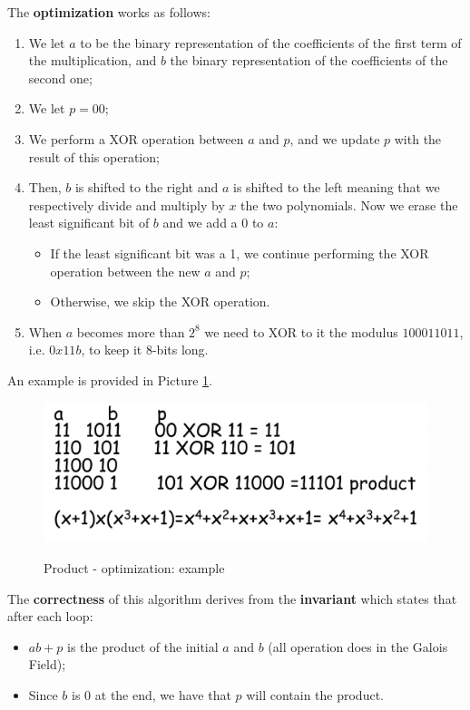The \textbf{optimization} works as follows:

\begin{enumerate}
    \item We let $a$ to be the binary representation of the coefficients of the first term of the multiplication, and $b$ the binary representation of the coefficients of the second one;
    \item We let $p = 00$;
    \item We perform a XOR operation between $a$ and $p$, and we update $p$ with the result of this operation;
    \item Then, $b$ is shifted to the right and $a$ is shifted to the left meaning that we respectively divide and multiply by $x$ the two polynomials. Now we erase the least significant bit of $b$ and we add a 0 to $a$:
    \begin{itemize}
        \item If the least significant bit was a 1, we continue performing the XOR operation between the new $a$ and $p$;
        \item Otherwise, we skip the XOR operation. 
    \end{itemize}
    \item When $a$ becomes more than $2^8$ we need to XOR to it the modulus $100011011$, i.e. $0x11b$, to keep it 8-bits long.
\end{enumerate}

An example is provided in Picture \ref{aes8}.

\begin{figure}[h!]
        \centering
        \includegraphics[scale = 0.65]{img/aes8.png}
        \label{aes8}
        \caption{Product - optimization: example}
\end{figure}

The \textbf{correctness} of this algorithm derives from the \textbf{invariant} which states that after each loop: 

\begin{itemize}
    \item $ab+p$ is the product of the initial $a$ and $b$ (all operation does in the Galois Field);
    \item Since $b$ is 0 at the end, we have that $p$ will contain the product.
\end{itemize}

